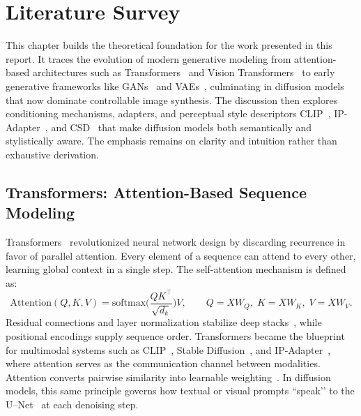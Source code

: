 \chapter{Literature Survey}
\label{chap:literature_survey}


This chapter builds the theoretical foundation for the work presented in this report.  
It traces the evolution of modern generative modeling from attention-based architectures such as Transformers~\cite{vaswani2017attention} and Vision Transformers~\cite{dosovitskiy2020vit} to early generative frameworks like GANs~\cite{goodfellow2014gan, karras2019stylegan} and VAEs~\cite{kingma2013autoencoding}, culminating in diffusion models that now dominate controllable image synthesis.  
The discussion then explores conditioning mechanisms, adapters, and perceptual style descriptors CLIP~\cite{radford2021clip}, IP-Adapter~\cite{chen2023ipadapter}, and CSD~\cite{somepalli2024csd} that make diffusion models both semantically and stylistically aware.  
The emphasis remains on clarity and intuition rather than exhaustive derivation.


\section{Transformers: Attention-Based Sequence Modeling}
\label{sec:transformers}

Transformers~\cite{vaswani2017attention} revolutionized neural network design by discarding recurrence in favor of parallel attention.  
Every element of a sequence can attend to every other, learning global context in a single step.  
The self-attention mechanism is defined as:
\[
\mathrm{Attention}(Q,K,V)
=\mathrm{softmax}\!\Big(\frac{QK^\top}{\sqrt{d_k}}\Big)V, \qquad
Q=XW_Q,\;K=XW_K,\;V=XW_V.
\]
Residual connections and layer normalization stabilize deep stacks~\cite{vaswani2017attention}, while positional encodings supply sequence order.  
Transformers became the blueprint for multimodal systems such as CLIP~\cite{radford2021clip}, Stable Diffusion~\cite{rombach2022ldm}, and IP-Adapter~\cite{chen2023ipadapter}, where attention serves as the communication channel between modalities.  
Attention converts pairwise similarity into learnable weighting~\cite{vaswani2017attention}.  
In diffusion models, this same principle governs how textual or visual prompts “speak’’ to the U–Net~\cite{ronneberger2015unet} at each denoising step.


